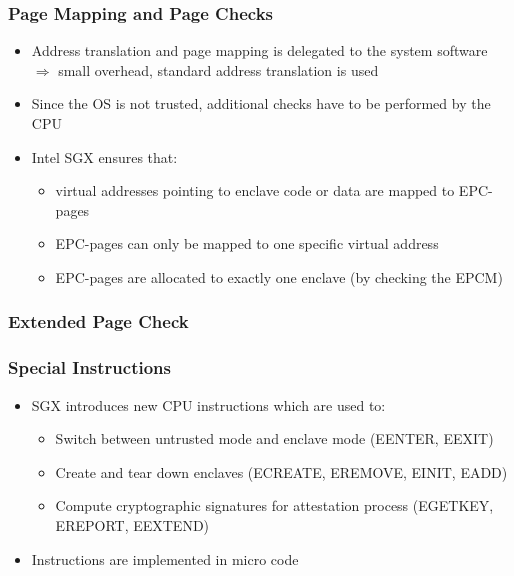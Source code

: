 \begin{frame}
    \frametitle{Page Mapping and Page Checks}
    \begin{itemize}[<+->]
        \item Address translation and page mapping is delegated to the system software \newline
              $\Rightarrow$ small overhead, standard address translation is used
        \item Since the OS is not trusted, additional checks have to be performed by the CPU
        \item Intel SGX ensures that: 
            \begin{itemize}
                \item virtual addresses pointing to enclave code or data are mapped to EPC-pages
                \item EPC-pages can only be mapped to one specific virtual address
                \item EPC-pages are allocated to exactly one enclave (by checking the EPCM)
            \end{itemize}
    \end{itemize}
\end{frame}

\begin{frame}
    \frametitle{Extended Page Check}
    \begin{figure}
        \centering
    \end{figure}
\end{frame}

\begin{frame}
    \frametitle{Special Instructions}
    \begin{itemize}[<+->]
        \item SGX introduces new CPU instructions which are used to:
        \begin{itemize}
            \item Switch between untrusted mode and enclave mode (EENTER, EEXIT)
            \item Create and tear down enclaves (ECREATE, EREMOVE, EINIT, EADD)
            \item Compute cryptographic signatures for attestation process (EGETKEY, EREPORT, EEXTEND)
        \end{itemize}
        \item Instructions are implemented in micro code
    \end{itemize}
\end{frame}

